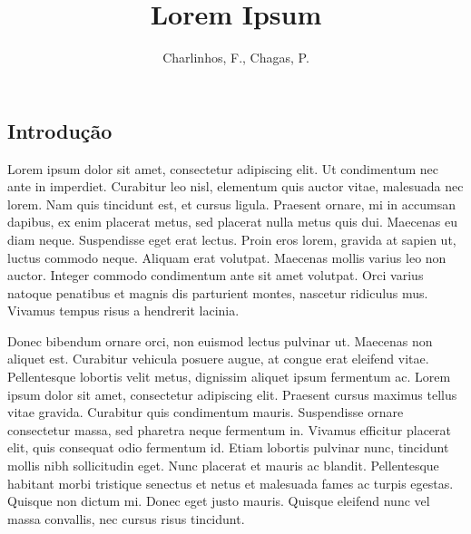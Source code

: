 \documentclass{sciposter}
\title{Lorem Ipsum}
\author{Charlinhos, F., Chagas, P.}
\institute 
{Programa de Pós-Graduação em Computação Aplicada - CAP\\
    Instituto Nacional de Pesquisas Espaciais - INPE \\
    Avenida dos Astronautas, 1758 - Jardim da Granja \\
    São José dos Campos - SP, Brasil - CEP 12227-010}
\begin{document}

\maketitle

\newcommand{\mycaption}{%
\ifx \@captype \@undefined \@latex@error {\noexpand \caption outside float}\@ehd \expandafter \@gobble \else \refstepcounter \@captype \expandafter \@firstofone \fi {\@dblarg {\@caption \@captype }}%
}%

\begin{multicols}{3}


\section{Introdução}


Lorem ipsum dolor sit amet, consectetur adipiscing elit. Ut condimentum nec ante in imperdiet. Curabitur leo nisl, elementum quis auctor vitae, malesuada nec lorem. Nam quis tincidunt est, et cursus ligula. Praesent ornare, mi in accumsan dapibus, ex enim placerat metus, sed placerat nulla metus quis dui. Maecenas eu diam neque. Suspendisse eget erat lectus. Proin eros lorem, gravida at sapien ut, luctus commodo neque. Aliquam erat volutpat. Maecenas mollis varius leo non auctor. Integer commodo condimentum ante sit amet volutpat. Orci varius natoque penatibus et magnis dis parturient montes, nascetur ridiculus mus. Vivamus tempus risus a hendrerit lacinia.

Donec bibendum ornare orci, non euismod lectus pulvinar ut. Maecenas non aliquet est. Curabitur vehicula posuere augue, at congue erat eleifend vitae. Pellentesque lobortis velit metus, dignissim aliquet ipsum fermentum ac. Lorem ipsum dolor sit amet, consectetur adipiscing elit. Praesent cursus maximus tellus vitae gravida. Curabitur quis condimentum mauris. Suspendisse ornare consectetur massa, sed pharetra neque fermentum in. Vivamus efficitur placerat elit, quis consequat odio fermentum id. Etiam lobortis pulvinar nunc, tincidunt mollis nibh sollicitudin eget. Nunc placerat et mauris ac blandit. Pellentesque habitant morbi tristique senectus et netus et malesuada fames ac turpis egestas. Quisque non dictum mi. Donec eget justo mauris. Quisque eleifend nunc vel massa convallis, nec cursus risus tincidunt.


\end{multicols}
\end{document}
